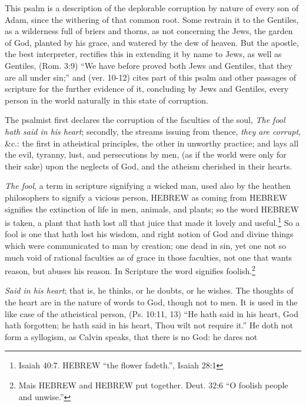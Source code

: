 This psalm is a description of the deplorable corruption by nature
of every son of Adam, since the withering of that common root.
Some restrain it to the Gentiles, as a wilderness full of briers and
thorns, as not concerning the Jews, the garden of God, planted by
his grace, and watered by the dew of heaven. But the apostle, the
best interpreter, rectifies this in extending it by name to Jews, as
well as Gentiles, (Rom. 3:9) ``We have before proved both Jews
and Gentiles, that they are all under sin;'' and (ver. 10-12) cites
part of this psalm and other passages of scripture for the further evidence
of it, concluding by Jews and Gentiles, every person in the
world naturally in this state of corruption.

The psalmist first declares the corruption of the faculties of the
soul, \emph{The fool hath said in his heart}; secondly, the streams issuing
from thence, \emph{they are corrupt}, \&c.: the first in atheistical principles,
the other in unworthy practice; and lays all the evil, tyranny, lust,
and persecutions by men, (as if the world were only for their sake)
upon the neglects of God, and the atheism cherished in their hearts.

\emph{The fool}, a term in scripture signifying a wicked man, used also
by the heathen philosophers to signify a vicious person, HEBREW as coming
from HEBREW signifies the extinction of life in men, animals, and
plants; so the word HEBREW is taken, a plant that hath lost all that juice
that made it lovely and useful.\footnote{Isaiah 40:7. HEBREW ``the flower fadeth.'', 
Isaiah 28:1} So a fool is one that hath lost
his wisdom, and right notion of God and divine things which were
communicated to man by creation; one dead in sin, yet one not
so much void of rational faculties as of grace in those faculties, not
one that wants reason, but abuses his reason. In Scripture the word
signifies foolish.\footnote{Mais HEBREW and HEBREW put together. Deut. 32:6 ``O foolish people and unwise.''} 

\emph{Said in his heart}; that is, he thinks, or he doubts, or he wishes.
The thoughts of the heart are in the nature of words to God, though
not to men. It is used in the like case of the atheistical person,
(Ps. 10:11, 13) ``He hath said in his heart, God hath forgotten; he
hath said in his heart, Thou wilt not require it.'' He doth not form
a syllogism, as Calvin speaks, that there is no God: he dares not
